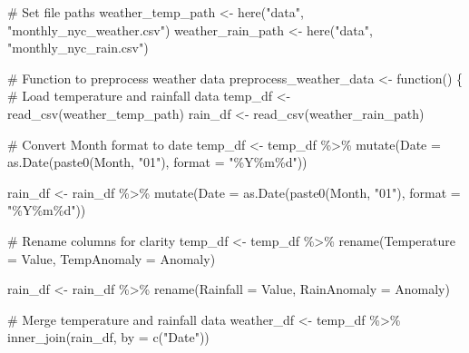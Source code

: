 \documentclass[
  letterpaper,
  DIV=11,
  numbers=noendperiod]{scrreprt}
\newenvironment{Shaded}{\begin{snugshade}}{\end{snugshade}}
\newcommand{\AttributeTok}[1]{\textcolor[rgb]{0.40,0.45,0.13}{#1}}
\newcommand{\CommentTok}[1]{\textcolor[rgb]{0.37,0.37,0.37}{#1}}
\newcommand{\ControlFlowTok}[1]{\textcolor[rgb]{0.00,0.23,0.31}{#1}}
\newcommand{\FunctionTok}[1]{\textcolor[rgb]{0.28,0.35,0.67}{#1}}
\newcommand{\NormalTok}[1]{\textcolor[rgb]{0.00,0.23,0.31}{#1}}
\newcommand{\OtherTok}[1]{\textcolor[rgb]{0.00,0.23,0.31}{#1}}
\newcommand{\SpecialCharTok}[1]{\textcolor[rgb]{0.37,0.37,0.37}{#1}}
\newcommand{\StringTok}[1]{\textcolor[rgb]{0.13,0.47,0.30}{#1}}
\begin{document}
\begin{Shaded}
\begin{Highlighting}[]
\CommentTok{\# Set file paths}
\NormalTok{weather\_temp\_path }\OtherTok{\textless{}{-}} \FunctionTok{here}\NormalTok{(}\StringTok{"data"}\NormalTok{, }\StringTok{"monthly\_nyc\_weather.csv"}\NormalTok{)}
\NormalTok{weather\_rain\_path }\OtherTok{\textless{}{-}} \FunctionTok{here}\NormalTok{(}\StringTok{"data"}\NormalTok{, }\StringTok{"monthly\_nyc\_rain.csv"}\NormalTok{)}

\CommentTok{\# Function to preprocess weather data}
\NormalTok{preprocess\_weather\_data }\OtherTok{\textless{}{-}} \ControlFlowTok{function}\NormalTok{() \{}
  \CommentTok{\# Load temperature and rainfall data}
\NormalTok{  temp\_df }\OtherTok{\textless{}{-}} \FunctionTok{read\_csv}\NormalTok{(weather\_temp\_path)}
\NormalTok{  rain\_df }\OtherTok{\textless{}{-}} \FunctionTok{read\_csv}\NormalTok{(weather\_rain\_path)}
  
  \CommentTok{\# Convert Month format to date}
\NormalTok{  temp\_df }\OtherTok{\textless{}{-}}\NormalTok{ temp\_df }\SpecialCharTok{\%\textgreater{}\%}
    \FunctionTok{mutate}\NormalTok{(}\AttributeTok{Date =} \FunctionTok{as.Date}\NormalTok{(}\FunctionTok{paste0}\NormalTok{(Month, }\StringTok{"01"}\NormalTok{), }\AttributeTok{format =} \StringTok{"\%Y\%m\%d"}\NormalTok{))}
  
\NormalTok{  rain\_df }\OtherTok{\textless{}{-}}\NormalTok{ rain\_df }\SpecialCharTok{\%\textgreater{}\%}
    \FunctionTok{mutate}\NormalTok{(}\AttributeTok{Date =} \FunctionTok{as.Date}\NormalTok{(}\FunctionTok{paste0}\NormalTok{(Month, }\StringTok{"01"}\NormalTok{), }\AttributeTok{format =} \StringTok{"\%Y\%m\%d"}\NormalTok{))}
  
  \CommentTok{\# Rename columns for clarity}
\NormalTok{  temp\_df }\OtherTok{\textless{}{-}}\NormalTok{ temp\_df }\SpecialCharTok{\%\textgreater{}\%}
    \FunctionTok{rename}\NormalTok{(}\AttributeTok{Temperature =}\NormalTok{ Value, }\AttributeTok{TempAnomaly =}\NormalTok{ Anomaly)}
  
\NormalTok{  rain\_df }\OtherTok{\textless{}{-}}\NormalTok{ rain\_df }\SpecialCharTok{\%\textgreater{}\%}
    \FunctionTok{rename}\NormalTok{(}\AttributeTok{Rainfall =}\NormalTok{ Value, }\AttributeTok{RainAnomaly =}\NormalTok{ Anomaly)}
  
  \CommentTok{\# Merge temperature and rainfall data}
\NormalTok{  weather\_df }\OtherTok{\textless{}{-}}\NormalTok{ temp\_df }\SpecialCharTok{\%\textgreater{}\%}
    \FunctionTok{inner\_join}\NormalTok{(rain\_df, }\AttributeTok{by =} \FunctionTok{c}\NormalTok{(}\StringTok{"Date"}\NormalTok{))}
  

\end{Highlighting}
\end{Shaded}
\end{document}
